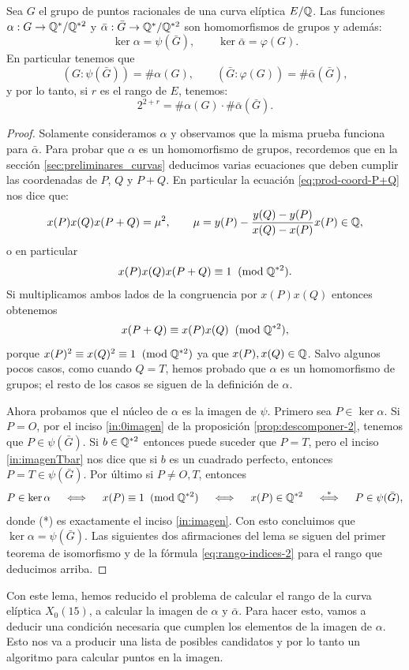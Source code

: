 \begin{lema}
	Sea $G$ el grupo de puntos racionales de una curva elíptica $E/\mathbb{Q}$. Las funciones $\alpha:G\rightarrow\mathbb{Q}^*/\mathbb{Q}^{*2}$ y $\bar{\alpha}:\bar{G}\rightarrow\mathbb{Q}^*/\mathbb{Q}^{*2}$ son homomorfismos de grupos y además:
	\[
		\ker\alpha=\psi(\bar{G}),\qquad \ker\bar{\alpha}=\varphi(G).
	\]
	En particular tenemos que
	\[
		(G:\psi(\bar{G}))=\#\alpha(G),\qquad (\bar{G}:\varphi(G))=\#\bar{\alpha}(\bar{G}),
	\]
	y por lo tanto, si $r$ es el rango de $E$, tenemos:
	\[
		2^{2+r}=\#\alpha(G)\cdot \#\bar{\alpha}(\bar{G}).
	\]
\end{lema}

\begin{proof}
Solamente consideramos $\alpha$ y observamos que la misma prueba funciona para $\bar{\alpha}$. Para probar que $\alpha$ es un homomorfismo de grupos, recordemos que en la sección \ref{sec:preliminares_curvas} deducimos varias ecuaciones que deben cumplir las coordenadas de $P$, $Q$ y $P+Q$. En particular la ecuación \ref{eq:prod-coord-P+Q} nos dice que:
\[
	x(P)x(Q)x(P+Q)=\mu^2,\qquad \mu=y(P)-\frac{y(Q)-y(P)}{x(Q)-x(P)}x(P)\in\mathbb{Q},
\]
o en particular
\[
	x(P)x(Q)x(P+Q)\equiv 1\;\;(\mathrm{mod}\; \mathbb{Q}^{*2}).
\]
Si multiplicamos ambos lados de la congruencia por $x(P)x(Q)$ entonces obtenemos
\[
	x(P+Q)\equiv x(P)x(Q)\;\;(\mathrm{mod}\; \mathbb{Q}^{*2}),
\]
porque $x(P)^2\equiv x(Q)^2\equiv1\;\;(\mathrm{mod}\; \mathbb{Q}^{*2})$ ya que $x(P),x(Q)\in\mathbb{Q}$. Salvo algunos pocos casos, como cuando $Q=T$, hemos probado que $\alpha$ es un homomorfismo de grupos; el resto de los casos se siguen de la definición de $\alpha$. 

Ahora probamos que el núcleo de $\alpha$ es la imagen de $\psi$. Primero sea $P\in\ker\alpha$. Si $P=O$, por el inciso \ref{in:0imagen} de la proposición \ref{prop:descomponer-2}, tenemos que $P\in\psi(\bar{G})$. Si $b\in\mathbb{Q}^{*2}$ entonces puede suceder que $P=T$, pero el inciso \ref{in:imagenTbar} nos dice que si $b$ es un cuadrado perfecto, entonces $P=T\in\psi(\bar{G})$. Por último si $P\neq O,T$, entonces
\[
	P\in\ker\alpha\quad\iff\quad x(P)\equiv 1\;\;(\mathrm{mod}\; \mathbb{Q}^{*2}) \quad\iff\quad x(P)\in\mathbb{Q}^{*2} \quad\overset{*}{\iff}\quad P\in\psi(\bar{G}),
\]
donde (*) es exactamente el inciso \ref{in:imagen}. Con esto concluimos que $\ker\alpha=\psi(\bar{G})$. Las siguientes dos afirmaciones del lema se siguen del primer teorema de isomorfismo y de la fórmula \eqref{eq:rango-indices-2} para el rango que deducimos arriba. 
\end{proof}

Con este lema, hemos reducido el problema de calcular el rango de la curva elíptica $X_0(15)$, a calcular la imagen de $\alpha$ y $\bar{\alpha}$. Para hacer esto, vamos a deducir una condición necesaria que cumplen los elementos de la imagen de $\alpha$. Esto nos va a producir una lista de posibles candidatos y por lo tanto un algoritmo para calcular puntos en la imagen.


